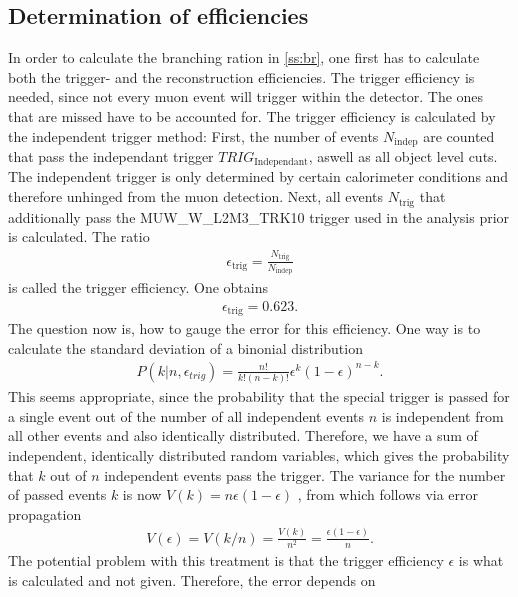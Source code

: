 \documentclass[twoside,        %
               BCOR12mm,       %
               ngerman,english, %
               fleqn,headsepline=false,footsepline=false
              ]{Vorlage/MFPREPORT}
\begin{document}
\subsection{Determination of efficiencies}
In order to calculate the branching ration in \cref{ss:br}, one first has to
calculate both the trigger- and the reconstruction efficiencies. The trigger
efficiency is needed, since not every muon event will trigger within the
detector. The ones that are missed have to be accounted for. The trigger
efficiency is calculated by the independent trigger method: First, the number
of events $N_\text{indep}$ are counted that pass the independant trigger
$TRIG_\text{Independant}$, aswell as all object level cuts.
The independent trigger is only determined by certain calorimeter conditions and therefore
unhinged from the muon detection. Next, all events $N_\text{trig}$ that
additionally pass the MUW\_W\_L2M3\_TRK10 trigger used in the analysis prior is
calculated.
The ratio
\begin{align}
    \label{eq:trigeff}
    \epsilon_\text{trig}=\frac{N_\text{trig}}{N_\text{indep}}
\end{align}
is called the trigger efficiency.
One obtains
\begin{align}
    \label{eq:trigeffvalue}
    \epsilon_\text{trig}=0.623.
\end{align}
The question now is, how to gauge the error for this efficiency. One way is to
calculate the standard deviation of a binonial distribution
\begin{align}
    \label{eq:binomial}
    P(k|n,\epsilon_{trig})=\frac{n!}{k!(n-k)!}\epsilon^k(1-\epsilon)^{n-k}.
\end{align}
This seems appropriate, since the probability that the special trigger is
passed for a single event out of the number of all independent events $n$ is
independent from all other events and also identically distributed. Therefore,
we have a sum of independent, identically distributed random variables, which
gives the probability that $k$ out of $n$ independent events pass the
trigger. The variance for the number of passed events $k$ is now
$V(k)=n\epsilon(1-\epsilon)$ \cite{efferror}, from which follows via error
propagation
\begin{align}
    \label{eq:kstd}
    V(\epsilon)=V(k/n)=\frac{V(k)}{n^2}=\frac{\epsilon(1-\epsilon)}{n}.
\end{align}
The potential problem with this treatment is that the trigger efficiency
$\epsilon$ is what is calculated and not given. Therefore, the error depends on
\end{document}
